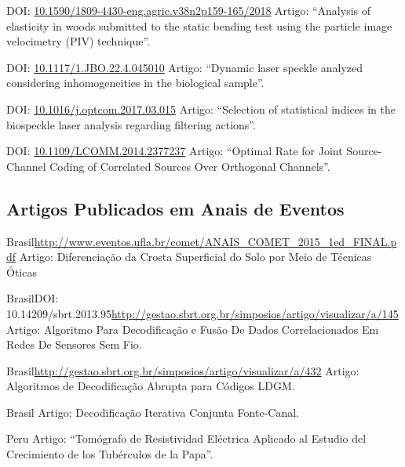\documentclass[11pt,a4paper,sans]{moderncv} %
\newcommand{\doiurl}[1]{\href{https://doi.org/#1}{#1}}
\begin{document}
	      {DOI: \doiurl{10.1590/1809-4430-eng.agric.v38n2p159-165/2018}}{}{}
	      {Artigo: ``Analysis of elasticity in woods submitted to the static bending test using the particle image velocimetry (PIV) technique''.}

	      {DOI: \doiurl{10.1117/1.JBO.22.4.045010}}{}{}
	      {Artigo: ``Dynamic laser speckle analyzed considering inhomogeneities in the biological sample''.}
	      
	      {DOI: \doiurl{10.1016/j.optcom.2017.03.015}}{}{}
	      {Artigo: ``Selection of statistical indices in the biospeckle laser analysis regarding filtering actions''.}
	      
	      {DOI: \doiurl{10.1109/LCOMM.2014.2377237}}{}{}
	      {Artigo: ``Optimal  Rate for Joint Source-Channel Coding of Correlated Sources Over Orthogonal Channels''.}

\subsection{Artigos Publicados em Anais de Eventos}

	      {Brasil}{}{\url{http://www.eventos.ufla.br/comet/ANAIS\_COMET\_2015\_1ed\_FINAL.pdf}}
	      {Artigo: Diferenciação da Crosta Superficial do Solo por Meio de Técnicas Óticas}

	      {Brasil}{DOI: 10.14209/sbrt.2013.95}{\url{http://gestao.sbrt.org.br/simposios/artigo/visualizar/a/145}}
	      {Artigo: Algoritmo Para Decodificação e Fusão De Dados Correlacionados Em Redes De Sensores Sem Fio.}

	      {Brasil}{}{\url{http://gestao.sbrt.org.br/simposios/artigo/visualizar/a/432}}
	      {Artigo: Algoritmos de Decodificação Abrupta para Códigos LDGM.}

	      {Brasil}{}{}%
	      {Artigo: Decodificação Iterativa Conjunta Fonte-Canal.}

	      {Peru}{}{}
	      {Artigo: ``Tomógrafo de Resistividad Eléctrica Aplicado al Estudio del Crecimiento de los Tubérculos de la Papa''.}
\end{document}
